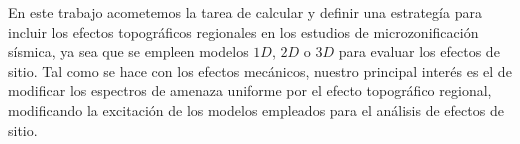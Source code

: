 \documentclass[spanish,letterpaper,12pt,twoside,openany]{article}
\begin{document}
En este trabajo acometemos la tarea de calcular y definir una estrategía para incluir los efectos topográficos regionales en los estudios de microzonificación sísmica, ya sea que se empleen modelos $1D$, $2D$ o $3D$ para evaluar los efectos de sitio. Tal como se hace con los efectos mecánicos, nuestro principal interés es el de modificar los espectros de amenaza uniforme por el efecto topográfico regional, modificando la excitación de los modelos empleados para el análisis de efectos de sitio. %
%
%
%
%
%
%
%
%
%
%
%
\end{document}
